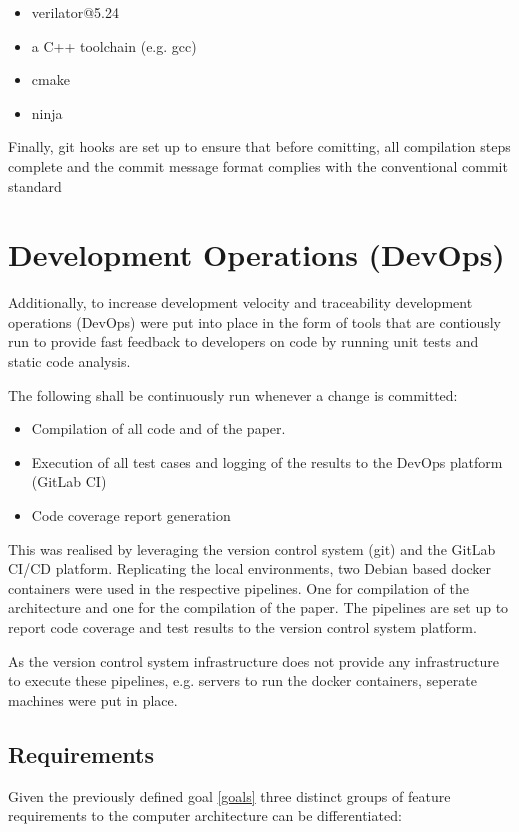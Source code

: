 \begin{itemize}
  \item verilator@5.24
  \item a C++ toolchain (e.g. gcc)
  \item cmake
  \item ninja
\end{itemize}
  

Finally, git hooks are set up to ensure that before comitting, all compilation steps complete and the commit message format complies with the conventional commit standard \cite{conventionalcommit}

\section{Development Operations (DevOps)}
Additionally, to increase development velocity and traceability development operations (DevOps) were put into place in the form of tools that are contiously run to provide fast feedback to developers on code by running unit tests and static code analysis. 

The following shall be continuously run whenever a change is committed:

\begin{itemize}
  \item Compilation of all code and of the paper.  
  \item Execution of all test cases and logging of the results to the DevOps platform (GitLab CI)
  \item Code coverage report generation
\end{itemize}

This was realised by leveraging the version control system (git) and the GitLab CI/CD platform. Replicating the local environments, two Debian based docker containers \cite{dockerVerilator} \cite{dockerLatex} were used in the respective pipelines. One for compilation of the architecture and one for the compilation of the paper. The pipelines are set up to report code coverage and test results to the version control system platform. 

As the version control system infrastructure does not provide any infrastructure to execute these pipelines, e.g. servers to run the docker containers, seperate machines were put in place.

\subsection{Requirements}
Given the previously defined goal \ref{goals} three distinct groups of feature requirements to the computer architecture can be differentiated: 

